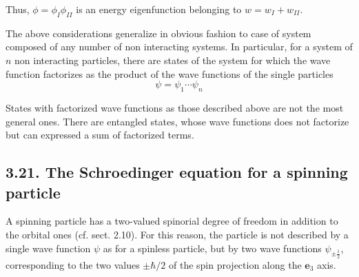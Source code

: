 \documentclass{article}
\begin{document}
Thus, $\phi=\phi_{I} \phi_{I I}$ is an energy eigenfunction belonging to $w=w_{I}+w_{I I}$.

The above considerations generalize in obvious fashion to case of system composed of any number of non interacting systems. In particular, for a system of $n$ non interacting particles, there are states of the system for which the wave function factorizes as the product of the wave functions of the single particles
$$
\begin{equation*}
\psi=\psi_{1} \cdots \psi_{n} \tag{3.20.30}
\end{equation*}
$$

States with factorized wave functions as those described above are not the most general ones. There are entangled states, whose wave functions does not factorize but can expressed a sum of factorized terms.

\subsection*{3.21. The Schroedinger equation for a spinning particle}

A spinning particle has a two-valued spinorial degree of freedom in addition to the orbital ones (cf. sect. 2.10). For this reason, the particle is not described by a single wave function $\psi$ as for a spinless particle, but by two wave functions $\psi_{ \pm \frac{1}{2}}$, corresponding to the two values $\pm \hbar / 2$ of the spin projection along the $\boldsymbol{e}_{3}$ axis.
\end{document}
